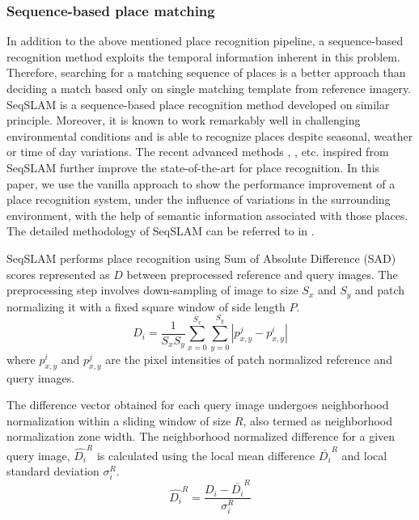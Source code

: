 \documentclass[letterpaper, 10 pt, conference]{ieeeconf}  %
\begin{document}
\subsubsection{Sequence-based place matching}
In addition to the above mentioned place recognition pipeline, a sequence-based recognition method exploits the temporal information inherent in this problem. Therefore, searching for a matching sequence of places is a better approach than deciding a match based only on single matching template from reference imagery. SeqSLAM \cite{Milford2012} is a sequence-based place recognition method developed on similar principle. Moreover, it is known to work remarkably well in challenging environmental conditions and is able to recognize places despite seasonal, weather or time of day variations. The recent advanced methods \cite{milford2015sequence}, \cite{wang2015improved}, \cite{milford2015place} etc. inspired from SeqSLAM further improve the state-of-the-art for place recognition. In this paper, we use the vanilla approach to show the performance improvement of a place recognition system, under the influence of variations in the surrounding environment, with the help of semantic information associated with those places. The detailed methodology of SeqSLAM can be referred to in \cite{Milford2012}.

SeqSLAM performs place recognition using Sum of Absolute Difference (SAD) scores represented as $D$ between preprocessed reference and query images. The preprocessing step involves down-sampling of image to size $S_x$ and $S_y$ and patch normalizing it with a fixed square window of side length $P$.
\begin{equation}
 D_i = \frac{1}{S_xS_y} \sum\limits_{x=0}^{S_x}\sum\limits_{y=0}^{S_y}|p_{x,y}^j-p_{x,y}^i|
 \label{eq:SADscore}
\end{equation}
where $p_{x,y}^i$ and $p_{x,y}^j$ are the pixel intensities of patch normalized reference and query images.

The difference vector obtained for each query image undergoes neighborhood normalization within a sliding window of size $R$, also termed as neighborhood normalization zone width. The neighborhood normalized difference for a given query image, $\hat{D_i}^R$ is calculated using the local mean difference $\bar{D_i}^R$ and local standard deviation $\sigma_i^R$.
\begin{equation}
 \hat{D_i}^R = \frac{D_i-\bar{D_i}^R}{\sigma_i^R}
 \label{eq:normScore}
\end{equation}
\end{document}
